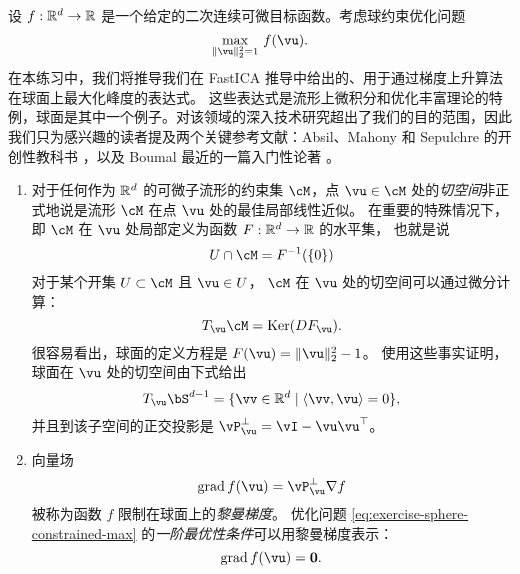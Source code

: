 \documentclass[../../book-main_zh.tex]{subfiles}
\begin{document}
\begin{exercise}\label{exercise:sphere-calculus}
    设 $f : \mathbb{R}^d \to \mathbb{R}$ 是一个给定的二次连续可微目标函数。考虑球约束优化问题
    \begin{equation}\label{eq:exercise-sphere-constrained-max}
        \max_{\norm{\vu}_2^2 = 1}\, f(\vu). 
    \end{equation}
    在本练习中，我们将推导我们在 FastICA 推导中给出的、用于通过梯度上升算法在球面上最大化峰度的表达式。
    这些表达式是流形上微积分和优化丰富理论的特例，球面是其中一个例子。对该领域的深入技术研究超出了我们的目的范围，因此我们只为感兴趣的读者提及两个关键参考文献：Absil、Mahony 和 Sepulchre 的开创性教科书
    \cite{Absil2009-nc}，以及 Boumal 最近的一篇入门性论著 \cite{Boumal2023-rj}。
    \begin{enumerate}
        \item 对于任何作为 $\mathbb{R}^d$ 的可微子流形的约束集 $\cM$，点 $\vu \in \cM$ 处的\textit{切空间}非正式地说是流形 $\cM$ 在点 $\vu$ 处的最佳局部线性近似。
        在重要的特殊情况下，即 $\cM$ 在 $\vu$ 处局部定义为函数 $F : \mathbb{R}^d \to \mathbb{R}$ 的水平集，
        也就是说
        \begin{equation*}
            U \cap \cM = F^{-1}(\set{0})
        \end{equation*}
        对于某个开集 $U \subset \cM$ 且 $\vu \in U$，
        $\cM$ 在 $\vu$ 处的切空间可以通过微分计算：
        \begin{equation*}
            T_{\vu} \cM = \Ker(DF_{\vu}).
        \end{equation*}
        很容易看出，球面的定义方程是 $F(\vu) = \norm{\vu}_2^2 - 1$。
        使用这些事实证明，球面在 $\vu$ 处的切空间由下式给出
        \begin{equation*}
            T_{\vu} \bS^{d-1} = \set{\vv \in \R^d \given \ip{\vv}{\vu} = 0},
        \end{equation*}
        并且到该子空间的正交投影是 $\vP_{\vu}^\perp = \vI - \vu\vu^\top$。
        \item 向量场
        \begin{equation}\label{eq:exercise-riemann-grad-sphere}
        \mathrm{grad}\, f(\vu) = \vP_{\vu}^\perp \nabla f
        \end{equation}
        被称为函数 $f$ 限制在球面上的\textit{黎曼梯度}。
        优化问题 \eqref{eq:exercise-sphere-constrained-max} 的\textit{一阶最优性条件}可以用黎曼梯度表示：
        \begin{equation*}
            \mathrm{grad}\, f(\vu) = \mathbf{0}.
        \end{equation*}

\end{enumerate}
\end{exercise}
\end{document}
